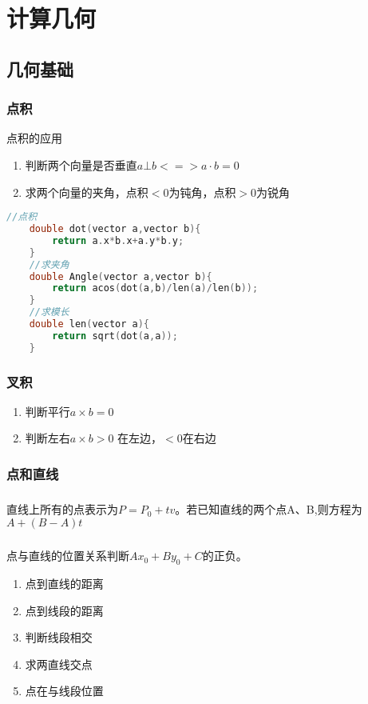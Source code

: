 \documentclass[]{article}
\begin{document}
\tableofcontents

\section{计算几何}
\label{sec:geometry}

\subsection{几何基础}
\label{sec:geometry_basic}
\subsubsection{点积}
\label{sec:dianji}
点积的应用  

\begin{enumerate}
\item 判断两个向量是否垂直$a\bot b <=> a·b = 0$
\item 求两个向量的夹角，点积$<0$为钝角，点积$>0$为锐角
\end{enumerate}

\begin{lstlisting}[language={c}]
    //点积
    double dot(vector a,vector b){
        return a.x*b.x+a.y*b.y;
    }
    //求夹角
    double Angle(vector a,vector b){
        return acos(dot(a,b)/len(a)/len(b));
    }
    //求模长
    double len(vector a){ 
        return sqrt(dot(a,a));
    }
\end{lstlisting}

\subsubsection{叉积}
\label{sec:chaji}

\begin{enumerate}
    \item 判断平行$a\times b = 0$
    \item 判断左右$a\times b > 0$ 在左边，$< 0$在右边
\end{enumerate}

\subsubsection{点和直线}

\subparagraph{}
直线上所有的点表示为$P = P_0+tv$。若已知直线的两个点A、B,则方程为$A+(B-A)t$
\subparagraph{}
点与直线的位置关系判断$Ax_0+By_0+C$的正负。

\begin{enumerate}
    \item 点到直线的距离
    \item 点到线段的距离
    \item 判断线段相交
    \item 求两直线交点
    \item 点在与线段位置
\end{enumerate}
\end{document}
